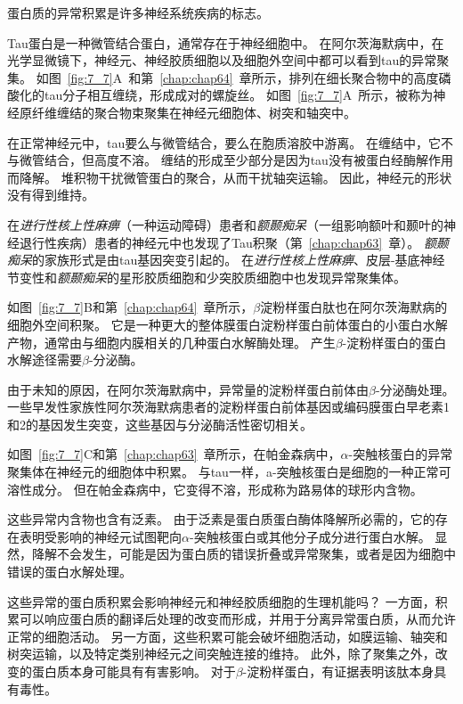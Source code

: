 \begin{proposition}[神经解剖学导航术语] \label{box:7_1}
	
	\quad \quad 蛋白质的异常积累是许多神经系统疾病的标志。
	
	\quad \quad Tau蛋白是一种微管结合蛋白，通常存在于神经细胞中。
	在阿尔茨海默病中，在光学显微镜下，神经元、神经胶质细胞以及细胞外空间中都可以看到tau的异常聚集。
	如图~\ref{fig:7_7}A~和第~\ref{chap:chap64}~章所示，排列在细长聚合物中的高度磷酸化的tau分子相互缠绕，形成成对的螺旋丝。
	如图~\ref{fig:7_7}A~所示，被称为神经原纤维缠结的聚合物束聚集在神经元细胞体、树突和轴突中。
	
	\quad \quad 在正常神经元中，tau要么与微管结合，要么在胞质溶胶中游离。
	在缠结中，它不与微管结合，但高度不溶。
	缠结的形成至少部分是因为tau没有被蛋白经酶解作用而降解。
	堆积物干扰微管蛋白的聚合，从而干扰轴突运输。
	因此，神经元的形状没有得到维持。
	
	\quad \quad 在\textit{进行性核上性麻痹}（一种运动障碍）患者和\textit{额颞痴呆}（一组影响额叶和颞叶的神经退行性疾病）患者的神经元中也发现了Tau积聚（第~\ref{chap:chap63}~章）。
	\textit{额颞痴呆}的家族形式是由tau基因突变引起的。
	在\textit{进行性核上性麻痹}、皮层-基底神经节变性和\textit{额颞痴呆}的星形胶质细胞和少突胶质细胞中也发现异常聚集体。
	
	\quad \quad 如图~\ref{fig:7_7}B和第~\ref{chap:chap64}~章所示，$\beta$淀粉样蛋白肽也在阿尔茨海默病的细胞外空间积聚。
	它是一种更大的整体膜蛋白淀粉样蛋白前体蛋白的小蛋白水解产物，通常由与细胞内膜相关的几种蛋白水解酶处理。
	产生$\beta$-淀粉样蛋白的蛋白水解途径需要$\beta$-分泌酶。
	
	\quad \quad 由于未知的原因，在阿尔茨海默病中，异常量的淀粉样蛋白前体由$\beta$-分泌酶处理。
	一些早发性家族性阿尔茨海默病患者的淀粉样蛋白前体基因或编码膜蛋白早老素1和2的基因发生突变，这些基因与分泌酶活性密切相关。
	
	\quad \quad 如图~\ref{fig:7_7}C和第~\ref{chap:chap63}~章所示，在帕金森病中，$\alpha$-突触核蛋白的异常聚集体在神经元的细胞体中积累。
	与tau一样，a-突触核蛋白是细胞的一种正常可溶性成分。
	但在帕金森病中，它变得不溶，形成称为路易体的球形内含物。
	
	\quad \quad 这些异常内含物也含有泛素。
	由于泛素是蛋白质蛋白酶体降解所必需的，它的存在表明受影响的神经元试图靶向$\alpha$-突触核蛋白或其他分子成分进行蛋白水解。
	显然，降解不会发生，可能是因为蛋白质的错误折叠或异常聚集，或者是因为细胞中错误的蛋白水解处理。
	
	\quad \quad 这些异常的蛋白质积累会影响神经元和神经胶质细胞的生理机能吗？
	一方面，积累可以响应蛋白质的翻译后处理的改变而形成，并用于分离异常蛋白质，从而允许正常的细胞活动。
	另一方面，这些积累可能会破坏细胞活动，如膜运输、轴突和树突运输，以及特定类别神经元之间突触连接的维持。
	此外，除了聚集之外，改变的蛋白质本身可能具有有害影响。
	对于$\beta$-淀粉样蛋白，有证据表明该肽本身具有毒性。
	
\end{proposition}


